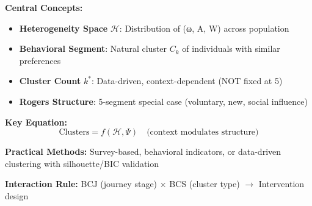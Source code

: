 

\begin{tcolorbox}[colback=blue!5!white, colframe=blue!75!black,
    title=Quick Reference: Chapter 14]

\textbf{Central Concepts:}
\begin{itemize}[nosep]
    \item \textbf{Heterogeneity Space} $\mathcal{H}$: Distribution of (ω, A, W) across population
    \item \textbf{Behavioral Segment}: Natural cluster $C_k$ of individuals with similar preferences
    \item \textbf{Cluster Count} $k^*$: Data-driven, context-dependent (NOT fixed at 5)
    \item \textbf{Rogers Structure}: 5-segment special case (voluntary, new, social influence)
\end{itemize}

\textbf{Key Equation:}
\begin{equation*}
\text{Clusters} = f(\mathcal{H}, \Psi) \quad \text{(context modulates structure)}
\end{equation*}

\textbf{Practical Methods:}
Survey-based, behavioral indicators, or data-driven clustering with silhouette/BIC validation

\textbf{Interaction Rule:} BCJ (journey stage) × BCS (cluster type) $\rightarrow$ Intervention design

\end{tcolorbox}


